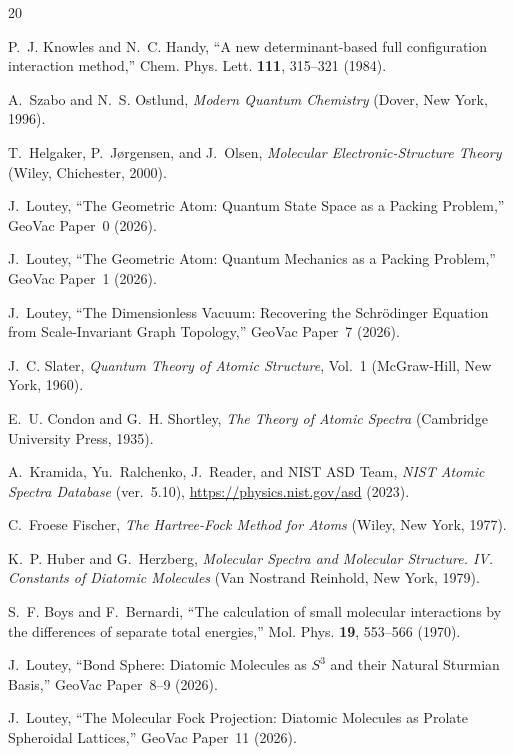 \documentclass[aps,pra,twocolumn,superscriptaddress,longbibliography,floatfix]{revtex4-2}
\begin{document}
\begin{thebibliography}{20}

P.~J. Knowles and N.~C. Handy,
``A new determinant-based full configuration interaction method,''
Chem. Phys. Lett. \textbf{111}, 315--321 (1984).

A.~Szabo and N.~S. Ostlund,
\textit{Modern Quantum Chemistry}
(Dover, New York, 1996).

T.~Helgaker, P.~J\o rgensen, and J.~Olsen,
\textit{Molecular Electronic-Structure Theory}
(Wiley, Chichester, 2000).

J.~Loutey,
``The Geometric Atom: Quantum State Space as a Packing Problem,''
GeoVac Paper~0 (2026).

J.~Loutey,
``The Geometric Atom: Quantum Mechanics as a Packing Problem,''
GeoVac Paper~1 (2026).

J.~Loutey,
``The Dimensionless Vacuum: Recovering the Schr\"odinger Equation
from Scale-Invariant Graph Topology,''
GeoVac Paper~7 (2026).

J.~C. Slater,
\textit{Quantum Theory of Atomic Structure}, Vol.~1
(McGraw-Hill, New York, 1960).

E.~U. Condon and G.~H. Shortley,
\textit{The Theory of Atomic Spectra}
(Cambridge University Press, 1935).

A.~Kramida, Yu.~Ralchenko, J.~Reader, and NIST ASD Team,
\textit{NIST Atomic Spectra Database} (ver.~5.10),
\url{https://physics.nist.gov/asd} (2023).

C.~Froese Fischer,
\textit{The Hartree-Fock Method for Atoms}
(Wiley, New York, 1977).

K.~P. Huber and G.~Herzberg,
\textit{Molecular Spectra and Molecular Structure. IV. Constants
of Diatomic Molecules}
(Van Nostrand Reinhold, New York, 1979).

S.~F. Boys and F.~Bernardi,
``The calculation of small molecular interactions by the differences
of separate total energies,''
Mol. Phys. \textbf{19}, 553--566 (1970).

J.~Loutey,
``Bond Sphere: Diatomic Molecules as $S^3$ and their Natural
Sturmian Basis,''
GeoVac Paper~8--9 (2026).

J.~Loutey,
``The Molecular Fock Projection: Diatomic Molecules as Prolate
Spheroidal Lattices,''
GeoVac Paper~11 (2026).

\end{thebibliography}
\end{document}
